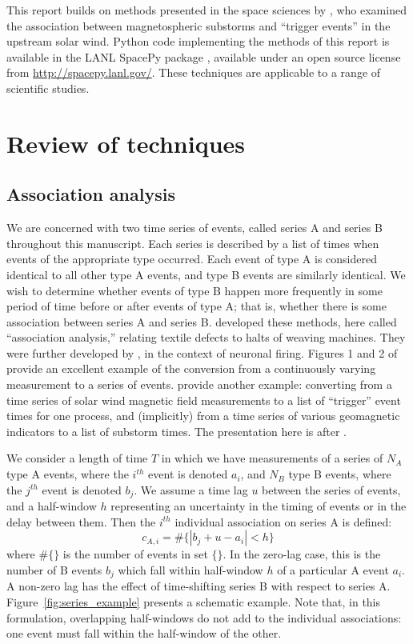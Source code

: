\documentclass[letterpaper,11pt]{article}
\begin{document}
This report builds on methods presented in the space sciences by
\citet{2007GeoRL..3408104M}, who examined the association between
magnetospheric substorms and ``trigger events'' in the upstream solar
wind. Python code implementing the methods of this report is available
in the LANL SpacePy package \citep[LA-CC-10-064;][]{spacepy11},
available under an open source license from
\url{http://spacepy.lanl.gov/}. These techniques are applicable to a
range of scientific studies.

\section{Review of techniques}
\subsection{Association analysis}
\label{sec:aa}
We are concerned with two time series of events, called series A and
series B throughout this manuscript. Each series is described by a
list of times when events of the appropriate type occurred. Each event
of type A is considered identical to all other type A events, and type
B events are similarly identical. We wish to determine whether events
of type B happen more frequently in some period of time before or
after events of type A; that is, whether there is some association
between series A and series B. \citet{cox55} developed these methods,
here called ``association analysis,'' relating textile defects to
halts of weaving machines. They were further developed by
\citet{brillinger76}, in the context of neuronal firing. Figures 1 and
2 of \citet{brillinger76} provide an excellent example of the
conversion from a continuously varying measurement to a series of
events. \citet{2007GeoRL..3408104M} provide another example:
converting from a time series of solar wind magnetic field
measurements to a list of ``trigger'' event times for one process, and
(implicitly) from a time series of various geomagnetic indicators to a
list of substorm times. The presentation here is after
\citet{2007GeoRL..3408104M}.

We consider a length of time $T$ in which we have measurements of a
series of $N_A$ type A events, where the $i^{th}$ event is denoted
$a_i$, and $N_B$ type B events, where the $j^{th}$ event is denoted
$b_j$. We assume a time lag $u$ between the series of events, and a
half-window $h$ representing an uncertainty in the timing of events or
in the delay between them. Then the $i^{th}$ individual association on
series A is defined:
\begin{equation}
\label{eq:assoc_number}
c_{A,i} = \#\{|b_j + u - a_i| < h\}
\end{equation}
where $\#\{\}$ is the number of events in set $\{\}$. In the zero-lag
case, this is the number of B events $b_j$ which fall within
half-window $h$ of a particular A event $a_i$. A non-zero lag has the
effect of time-shifting series B with respect to series
A. Figure~\ref{fig:series_example} presents a schematic example. Note
that, in this formulation, overlapping half-windows do not add to the
individual associations: one event must fall within the half-window of
the other.
\end{document}
